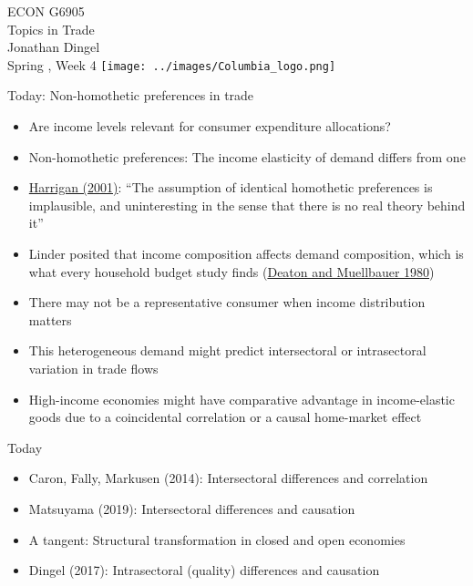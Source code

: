 \documentclass[11pt,notes=hide,aspectratio=169]{beamer}
\begin{document}
\begin{frame}[plain]
\begin{center}
\large
\textcolor{columbiadarkblue}{ECON G6905\\
Topics in Trade\\ 
Jonathan Dingel\\
Spring \the\year, Week 4}
\vfill 
\texttt{[image: ../images/Columbia\_logo.png]}
\end{center}
\end{frame}
\begin{frame}{Today: Non-homothetic preferences in trade}
\begin{itemize}
	\item Are income levels relevant for consumer expenditure allocations?
	\item Non-homothetic preferences: The income elasticity of demand differs from one
	\item {\small \href{https://www.nber.org/papers/w8675}{Harrigan (2001)}: ``The assumption of identical homothetic preferences is implausible, and uninteresting in the sense that there is no real theory behind it''}
	\item Linder posited that income composition affects demand composition, which is what every household budget study finds (\href{http://www.cambridge.org/us/academic/subjects/economics/microeconomics/economics-and-consumer-behavior?format=PB&isbn=9780521296762}{Deaton and Muellbauer 1980})
	\item There may not be a representative consumer when income distribution matters
	\item This heterogeneous demand might predict intersectoral or intrasectoral variation in trade flows
	\item {High-income economies might have comparative advantage in income-elastic goods due to a coincidental correlation or a causal home-market effect\par}
\end{itemize}
\end{frame}
\begin{frame}{Today}
\begin{itemize}
\item Caron, Fally, Markusen (2014): Intersectoral differences and correlation
\item Matsuyama (2019): Intersectoral differences and causation
\item A tangent: Structural transformation in closed and open economies
\item Dingel (2017): Intrasectoral (quality) differences and causation
\end{itemize}
\end{frame}
\end{document}
